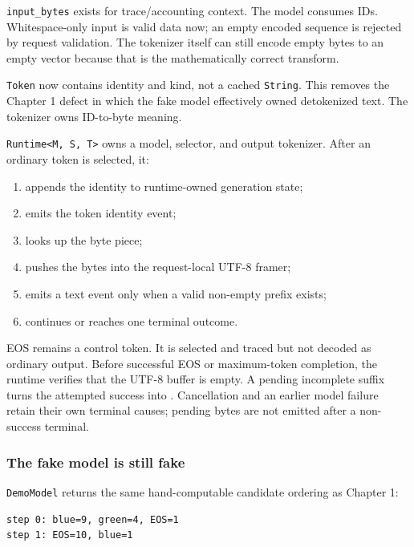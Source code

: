 \documentclass[
  10pt,
]{article}
\providecommand{\tightlist}{%
  \setlength{\itemsep}{0pt}\setlength{\parskip}{0pt}}
\begin{document}
\texttt{input\_bytes} exists for trace/accounting context. The model
consumes IDs. Whitespace-only input is valid data now; an empty encoded
sequence is rejected by request validation. The tokenizer itself can
still encode empty bytes to an empty vector because that is the
mathematically correct transform.

\texttt{Token} now contains identity and kind, not a cached
\texttt{String}. This removes the Chapter 1 defect in which the fake
model effectively owned detokenized text. The tokenizer owns ID-to-byte
meaning.

\texttt{Runtime\textless{}M,\ S,\ T\textgreater{}} owns a model,
selector, and output tokenizer. After an ordinary token is selected, it:

\begin{enumerate}
\def\labelenumi{\arabic{enumi}.}
\tightlist
\item
  appends the identity to runtime-owned generation state;
\item
  emits the token identity event;
\item
  looks up the byte piece;
\item
  pushes the bytes into the request-local UTF-8 framer;
\item
  emits a text event only when a valid non-empty prefix exists;
\item
  continues or reaches one terminal outcome.
\end{enumerate}

EOS remains a control token. It is selected and traced but not decoded
as ordinary output. Before successful EOS or maximum-token completion,
the runtime verifies that the UTF-8 buffer is empty. A pending
incomplete suffix turns the attempted success into
\texttt{}. Cancellation and an earlier
model failure retain their own terminal causes; pending bytes are not
emitted after a non-success terminal.

\subsubsection{The fake model is still
fake}\label{the-fake-model-is-still-fake}

\texttt{DemoModel} returns the same hand-computable candidate ordering
as Chapter 1:

\begin{verbatim}
step 0: blue=9, green=4, EOS=1
step 1: EOS=10, blue=1
\end{verbatim}
\end{document}
